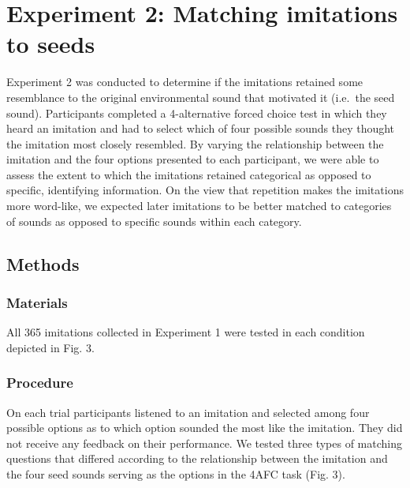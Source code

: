 \documentclass[10pt,letterpaper]{article}
\begin{document}
\section{Experiment 2: Matching imitations to
seeds}\label{experiment-2-matching-imitations-to-seeds}

Experiment 2 was conducted to determine if the imitations retained some
resemblance to the original environmental sound that motivated it
(i.e.~the seed sound). Participants completed a 4-alternative forced
choice test in which they heard an imitation and had to select which of
four possible sounds they thought the imitation most closely resembled.
By varying the relationship between the imitation and the four options
presented to each participant, we were able to assess the extent to
which the imitations retained categorical as opposed to specific,
identifying information. On the view that repetition makes the
imitations more word-like, we expected later imitations to be better
matched to categories of sounds as opposed to specific sounds within
each category.

\subsection{Methods}\label{methods-1}

\subsubsection{Materials}\label{materials-1}

All 365 imitations collected in Experiment 1 were tested in each
condition depicted in Fig. 3.

\subsubsection{Procedure}\label{procedure-1}

On each trial participants listened to an imitation and selected among
four possible options as to which option sounded the most like the
imitation. They did not receive any feedback on their performance. We
tested three types of matching questions that differed according to the
relationship between the imitation and the four seed sounds serving as
the options in the 4AFC task (Fig. 3).
\end{document}
